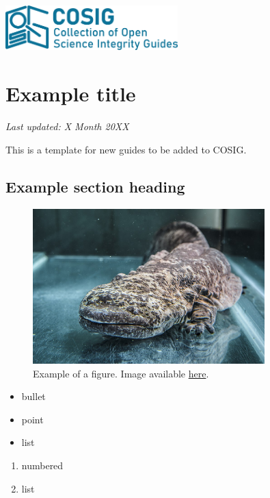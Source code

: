 \documentclass[letterpaper, 12pt]{article}
\begin{document}
\flushleft
\includegraphics[width=0.5\textwidth]{img/home/241017_final_logo_mockup.png}

\section*{Example title}
\textit{Last updated: X Month 20XX}

This is a template for new guides to be added to COSIG.

\subsection*{Example section heading}

\begin{figure}[h!tbp]
    \centering
    \includegraphics[width=0.8\textwidth]{img/home/chinese_giant_salamander.jpg}
    \caption*{Example of a figure. Image available \href{https://commons.wikimedia.org/wiki/File:Velemlok_\%C4\%8D\%C3\%ADnsk\%C3\%BD_zoo_praha_1.jpg}{here}.}
\end{figure}

\begin{itemize}
    \setlength\itemsep{-0.5em}
    \item bullet
    \item point
    \item list
\end{itemize}

\begin{enumerate}
    \setlength\itemsep{-0.5em}
    \item numbered
    \item list
\end{enumerate}
\end{document}
